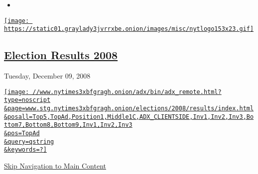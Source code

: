 \begin{itemize}
\item
\end{itemize}

\href{//www.nytimes3xbfgragh.onion}{\texttt{[image: https://static01.graylady3jvrrxbe.onion/images/misc/nytlogo153x23.gif]}}

\hypertarget{election-results-2008}{%
\subsection{\texorpdfstring{\href{votes.html}{Election Results
2008}}{Election Results 2008}}\label{election-results-2008}}

Tuesday, December 09, 2008

\href{//www.nytimes3xbfgragh.onion/adx/bin/adx_click.html?type=cookie\&pos=TopAd}{\texttt{[image: //www.nytimes3xbfgragh.onion/adx/bin/adx\_remote.html?type=noscript\\\&page=www.stg.nytimes3xbfgragh.onion/elections/2008/results/index.html\\\&posall=Top5,TopAd,Position1,Middle1C,ADX\_CLIENTSIDE,Inv1,Inv2,Inv3,Bottom7,Bottom8,Bottom9,Inv1,Inv2,Inv3\\\&pos=TopAd\\\&query=qstring\\\&keywords=?]}}

\protect\hyperlink{nytint-anchor-mainContent}{Skip Navigation to Main
Content}

